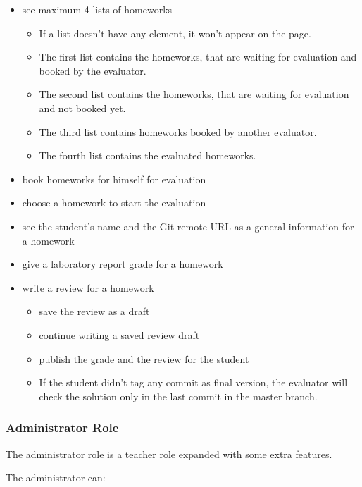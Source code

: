 \begin{itemize}
	\item see maximum 4 lists of homeworks
	\begin{itemize}
		\item If a list doesn't have any element, it won't appear on the page.
		\item The first list contains the homeworks, that are waiting for evaluation and booked by the evaluator. 
		\item The second list contains the homeworks, that are waiting for evaluation and not booked yet. 
		\item The third list contains homeworks booked by another evaluator. 
		\item The fourth list contains the evaluated homeworks. 
	\end{itemize}
	\item book homeworks for himself for evaluation
	\item choose a homework to start the evaluation
	\item see the student's name and the Git remote URL as a general information for a homework
	\item give a laboratory report grade for a homework
	\item write a review for a homework
		\begin{itemize}
			\item save the review as a draft
			\item continue writing a saved review draft
			\item publish the grade and the review for the student
			\item If the student didn't tag any commit as final version, the evaluator will check the solution only in the last commit in the master branch.
		\end{itemize}
\end{itemize}

\subsubsection{Administrator Role}

The administrator role is a teacher role expanded with some extra features.

The administrator can:

